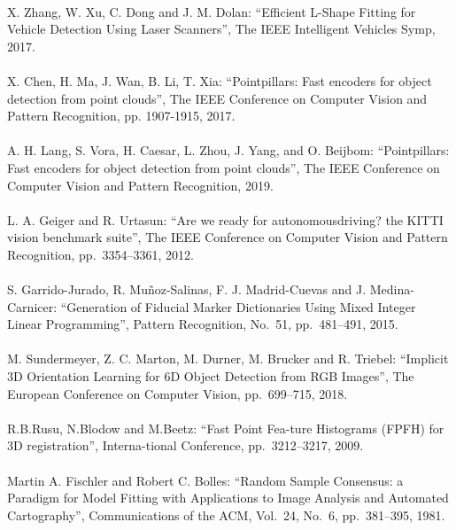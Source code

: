 \begin{mythebibliography}{}
\leavevmode \\ X. Zhang, W. Xu, C. Dong and J. M. Dolan:
\newblock ``Efficient L-Shape Fitting for Vehicle Detection Using Laser Scanners'',
\newblock The IEEE Intelligent Vehicles Symp, 2017.
\\
\leavevmode \\X. Chen, H. Ma, J. Wan, B. Li, T. Xia:
\newblock ``Pointpillars: Fast encoders for object detection from point clouds'',
\newblock The IEEE Conference on Computer Vision and Pattern Recognition, pp. 1907-1915, 2017.
\\
\leavevmode \\A. H. Lang, S. Vora, H. Caesar, L. Zhou, J. Yang, and O. Beijbom:
\newblock ``Pointpillars: Fast encoders for object detection from point clouds'',
\newblock The IEEE Conference on Computer Vision and Pattern Recognition, 2019.
\\


\leavevmode \\L. A. Geiger and R. Urtasun:
\newblock ``Are we ready for autonomousdriving? the KITTI vision benchmark suite'',
\newblock The IEEE Conference on Computer Vision and Pattern Recognition, pp.~3354--3361, 2012.
\\

\leavevmode \\S. Garrido-Jurado, R. Muñoz-Salinas, F. J. Madrid-Cuevas and J. Medina-Carnicer:
\newblock ``Generation of Fiducial Marker Dictionaries Using Mixed Integer Linear Programming'',
\newblock Pattern Recognition, No.~51, pp.~481--491, 2015.
\\

\leavevmode \\M. Sundermeyer, Z. C. Marton, M. Durner, M. Brucker and R. Triebel:
\newblock ``Implicit 3D Orientation Learning for 6D Object Detection from RGB Images'',
\newblock The European Conference on Computer Vision, pp.~699--715, 2018.
\\

\leavevmode \\R.B.Rusu, N.Blodow and M.Beetz:
\newblock ``Fast Point Fea-ture Histograms (FPFH) for 3D registration'',
\newblock Interna-tional Conference, pp.~3212--3217, 2009.
\\

\leavevmode \\Martin A. Fischler and Robert C. Bolles:
\newblock ``Random Sample Consensus: a Paradigm for Model Fitting with Applications to Image Analysis and Automated Cartography'',
\newblock Communications of the ACM, Vol.~24, No.~6, pp.~381--395, 1981.
\\


\end{mythebibliography}

